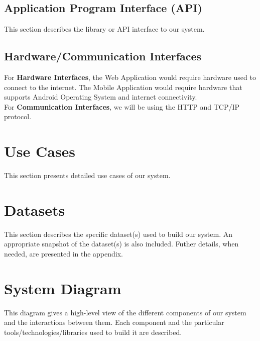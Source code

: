 \subsection{Application Program Interface (API)}
This section describes the library or API interface to our system.

\subsection{Hardware/Communication Interfaces}
For \textbf{Hardware Interfaces}, the Web Application would require hardware used to connect to the internet. The Mobile Application would require hardware that supports Android Operating System and internet connectivity. \\ For \textbf{Communication Interfaces}, we will be using the HTTP and TCP/IP protocol.

\section{Use Cases}
This section presents detailed use cases of our system.

\section{Datasets}
This section describes the specific dataset(s) used to build our system. An appropriate snapshot of the dataset(s) is also included. Futher details, when needed, are presented in the appendix.

\section{System Diagram}
This diagram gives a high-level view of the different components of our system and the interactions between them. Each component and the particular tools/technologies/libraries used to build it are described.